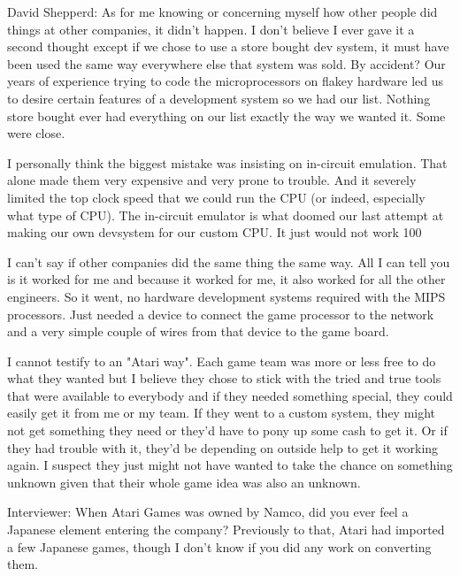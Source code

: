 \textcolor{interviewee}{David Shepperd:} As for me knowing or concerning myself how other people did things at other companies, it didn't happen. I don't believe I ever gave it a second thought except if we chose to use a store bought dev system, it must have been used the same way everywhere else that system was sold. By accident? Our years of experience trying to code the microprocessors on flakey hardware led us to desire certain features of a development system so we had our list. Nothing store bought ever had everything on our list exactly the way we wanted it. Some were close. 

I personally think the biggest mistake was insisting on in-circuit emulation. That alone made them very expensive and very prone to trouble. And it severely limited the top clock speed that we could run the CPU (or indeed, especially what type of CPU). The in-circuit emulator is what doomed our last attempt at making our own devsystem for our custom CPU. It just would not work 100%

I can't say if other companies did the same thing the same way. All I can tell you is it worked for me and because it worked for me, it also worked for all the other engineers. So it went, no hardware development systems required with the MIPS processors. Just needed a device to connect the game processor to the network and a very simple couple of wires from that device to the game board.

I cannot testify to an "Atari way". Each game team was more or less free to do what they wanted but I believe they chose to stick with the tried and true tools that were available to everybody and if they needed something special, they could easily get it from me or my team. If they went to a custom system, they might not get something they need or they'd have to pony up some cash to get it. Or if they had trouble with it, they'd be depending on outside help to get it working again. I suspect they just might not have wanted to take the chance on something unknown given that their whole game idea was also an unknown.

\textcolor{interviewer}{Interviewer:} When Atari Games was owned by Namco, did you ever feel a Japanese element entering the company? Previously to that, Atari had imported a few Japanese games, though I don’t know if you did any work on converting them.

